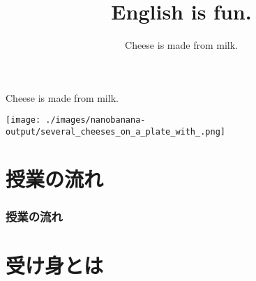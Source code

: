 \documentclass[aspectratio=169,xcolor={dvipsnames,table}]{beamer}
\title{English is fun.}
\subtitle{Cheese is made from milk.}
\author{}
\institute[]{}
\date[]
\begin{document}
\begin{frame}[plain]
  \titlepage
\end{frame}
\begin{frame}[plain]{Cheese is made from milk.}
 
\texttt{[image: ./images/nanobanana-output/several\_cheeses\_on\_a\_plate\_with\_.png]}
\end{frame}
\section*{授業の流れ}
\begin{frame}[plain]
  \frametitle{授業の流れ}
  \tableofcontents
\end{frame}
\section{受け身とは}
\end{document}
